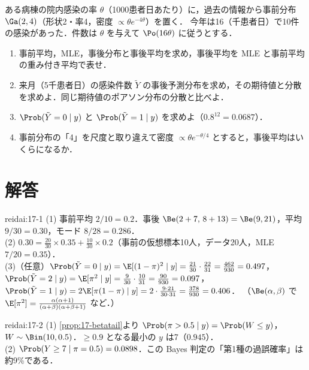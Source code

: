\begin{reidai}\label{reidai:17-3}
ある病棟の院内感染の率 $\theta$（1000患者日あたり）に，過去の情報から事前分布 $\Ga(2,4)$（形状2・率4，密度 $\propto\theta e^{-4\theta}$）を置く．
今年は16（千患者日）で10件の感染があった．件数は $\theta$ を与えて $\Po(16\theta)$ に従うとする．
\begin{enumerate}[label=(\arabic*)]
\item 事前平均，MLE，事後分布と事後平均を求め，事後平均を MLE と事前平均の重み付き平均で表せ．
\item 来月（5千患者日）の感染件数 $\tilde Y$ の事後予測分布を求め，その期待値と分散を求めよ．同じ期待値のポアソン分布の分散と比べよ．
\item $\Prob(\tilde Y=0\mid y)$ と $\Prob(\tilde Y=1\mid y)$ を求めよ（$0.8^{12}=0.0687$）．
\item 事前分布の「4」を尺度と取り違えて密度 $\propto\theta e^{-\theta/4}$ とすると，事後平均はいくらになるか．
\end{enumerate}
\end{reidai}

\section{解答}\label{sec:17-sol}
\begin{kaitou}{reidai:17-1}
(1) 事前平均 $2/10=0.2$．事後 $\Be(2+7,\,8+13)=\Be(9,21)$，平均 $9/30=0.30$，モード $8/28=0.286$．\\
(2) $0.30=\frac{20}{30}\times0.35+\frac{10}{30}\times0.2$（事前の仮想標本10人，データ20人，MLE $7/20=0.35$）．\\
(3)（任意）$\Prob(\tilde Y=0\mid y)=\E[(1-\pi)^2\mid y]=\frac{21}{30}\cdot\frac{22}{31}=\frac{462}{930}=0.497$，
$\Prob(\tilde Y=2\mid y)=\E[\pi^2\mid y]=\frac{9}{30}\cdot\frac{10}{31}=\frac{90}{930}=0.097$，
$\Prob(\tilde Y=1\mid y)=2\E[\pi(1-\pi)\mid y]=2\cdot\frac{9\cdot21}{30\cdot31}=\frac{378}{930}=0.406$．
（$\Be(\alpha,\beta)$ で $\E[\pi^2]=\frac{\alpha(\alpha+1)}{(\alpha+\beta)(\alpha+\beta+1)}$ など．）
\end{kaitou}

\begin{kaitou}{reidai:17-2}
(1) \cref{prop:17-betatail}より $\Prob(\pi>0.5\mid y)=\Prob(W\le y)$，$W\sim\Bin(10,0.5)$．$\ge0.9$ となる最小の $y$ は7（$0.945$）．\\
(2) $\Prob(Y\ge7\mid\pi=0.5)=0.0898$．この Bayes 判定の「第1種の過誤確率」は約9\%である．
\end{kaitou}

